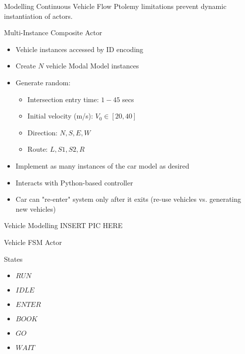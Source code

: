 \documentclass{beamer}
\begin{document}
\begin{frame}{Modelling Continuous Vehicle Flow}
Ptolemy limitations prevent dynamic instantiation of actors.\\
\begin{block}{Multi-Instance Composite Actor}
\begin{minipage}{0.45\linewidth}
\begin{itemize}
\item Vehicle instances accessed by ID encoding
\item Create $N$ vehicle Modal Model instances
\item Generate random:
\begin{itemize}
\item Intersection entry time: $1-45$ secs
\item Initial velocity (m/s): $V_0 \in [20,40]$
\item Direction: $N,S,E,W$
\item Route: $L,S1,S2,R$
\end{itemize}
\end{itemize}
\end{minipage}
\hfill
\begin{minipage}{0.45\linewidth}

\begin{itemize}
\item Implement as many instances of the car model as desired
\item Interacts with Python-based controller
\item Car can "re-enter" system only after it exits (re-use vehicles 
	vs. generating new vehicles)
\end{itemize}
\end{minipage}
\end{block}
\end{frame}


\begin{frame}{Vehicle Modelling}
INSERT PIC HERE
\end{frame}

\begin{frame}{Vehicle FSM Actor}
\begin{block}{States}
\begin{itemize}
\item $RUN$
\item $IDLE$
\item $ENTER$
\item $BOOK$
\item $GO$
\item $WAIT$
\end{itemize}
\end{block}
\end{frame}
\end{document}
